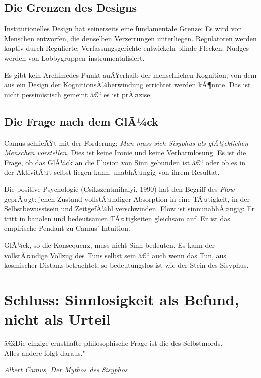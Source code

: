 ﻿\documentclass[12pt, a4paper]{article}
\begin{document}
\subsection{Die Grenzen des Designs}

Institutionelles Design hat seinerseits eine fundamentale Grenze: Es wird
von Menschen entworfen, die denselben Verzerrungen unterliegen. Regulatoren
werden kaptiv durch Regulierte; Verfassungsgerichte entwickeln blinde
Flecken; Nudges werden von Lobbygruppen instrumentalisiert.

Es gibt kein Archimedes-Punkt auÃŸerhalb der menschlichen Kognition,
von dem aus ein Design der KognitionsÃ¼berwindung errichtet werden kÃ¶nnte.
Das ist nicht pessimistisch gemeint â€“ es ist prÃ¤zise.

\subsection{Die Frage nach dem GlÃ¼ck}

Camus schlieÃŸt mit der Forderung: \textit{Man muss sich Sisyphus als
glÃ¼cklichen Menschen vorstellen.} Dies ist keine Ironie und keine Verharmlosung.
Es ist die Frage, ob das GlÃ¼ck an die Illusion von Sinn gebunden ist â€“
oder ob es in der AktivitÃ¤t selbst liegen kann, unabhÃ¤ngig von ihrem Resultat.

Die positive Psychologie (Csikszentmihalyi, 1990) hat den Begriff des
\emph{Flow} geprÃ¤gt: jenen Zustand vollstÃ¤ndiger Absorption in eine TÃ¤tigkeit,
in der Selbstbewusstsein und ZeitgefÃ¼hl verschwinden. Flow ist sinnunabhÃ¤ngig:
Er tritt in banalen und bedeutsamen TÃ¤tigkeiten gleichsam auf. Er ist das
empirische Pendant zu Camus' Intuition.

GlÃ¼ck, so die Konsequenz, muss nicht Sinn bedeuten. Es kann der vollstÃ¤ndige
Vollzug des Tuns selbst sein â€“ auch wenn das Tun, aus kosmischer Distanz
betrachtet, so bedeutungslos ist wie der Stein des Sisyphus.

\section{Schluss: Sinnlosigkeit als Befund, nicht als Urteil}

\epigraph{â€žDie einzige ernsthafte philosophische Frage ist die des Selbstmords.\\
Alles andere folgt daraus."}{\textit{Albert Camus, Der Mythos des Sisyphos}}
\end{document}
